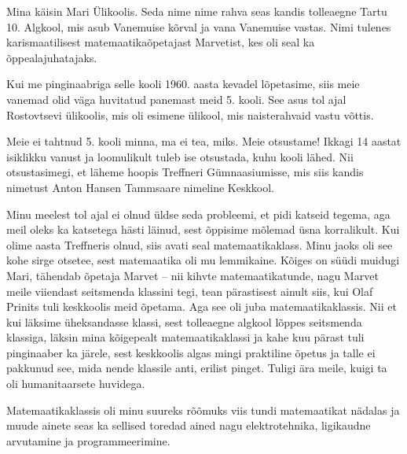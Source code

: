 

Mina käisin Mari Ülikoolis. Seda nime
nime rahva seas kandis tolleaegne Tartu 10. Algkool, mis asub Vanemuise 
kõrval ja vana Vanemuise vastas. Nimi tulenes karismaatilisest 
matemaatikaõpetajast Marvetist, kes oli seal ka õppealajuhatajaks.

Kui me pinginaabriga selle kooli 1960. aasta kevadel lõpetasime, siis 
meie vanemad olid väga huvitatud panemast meid 5. kooli. See asus tol ajal Rostovtsevi ülikoolis, mis oli esimene 
ülikool, mis naisterahvaid vastu võttis. 

Meie ei tahtnud 5. kooli minna, ma ei tea, miks. Meie otsustame! 
Ikkagi 14 aastat isiklikku vanust ja loomulikult tuleb ise otsustada, kuhu kooli 
lähed. Nii otsustasimegi, et läheme hoopis 
Treffneri Gümnaasiumisse, mis siis kandis 
nimetust Anton Hansen Tammsaare nimeline Keskkool. 

Minu meelest tol ajal ei 
olnud üldse seda probleemi, et pidi katseid tegema, aga 
meil oleks ka katsetega hästi läinud, sest õppisime mõlemad üsna 
korralikult. Kui olime aasta Treffneris olnud, siis avati seal 
matemaatikaklass. Minu jaoks oli see kohe sirge otsetee, sest
matemaatika oli mu lemmikaine. Kõiges on süüdi muidugi Mari, tähendab õpetaja 
Marvet -- nii kihvte matemaatikatunde, 
nagu Marvet meile viiendast seitsmenda klassini tegi, tean pärastisest ainult siis, 
kui Olaf Prinits tuli keskkoolis meid õpetama. Aga 
see oli juba matemaatikaklassis. Nii et kui läksime üheksandasse klassi, sest 
tolleaegne algkool lõppes seitsmenda klassiga, läksin mina kõigepealt matemaatikaklassi ja kahe kuu pärast tuli pinginaaber ka järele, sest 
keskkoolis algas mingi praktiline õpetus ja talle ei pakkunud see, mida nende 
klassile anti, erilist pinget. Tuligi ära meile, 
kuigi ta oli humanitaarsete huvidega. 

Matemaatikaklassis oli minu suureks rõõmuks viis tundi matemaatikat nädalas 
ja muude ainete seas ka sellised toredad ained nagu elektrotehnika, ligikaudne 
arvutamine ja programmeerimine. 


